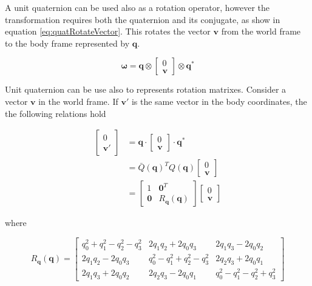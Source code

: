 \noindent A unit quaternion can be used also as a rotation operator, however the transformation requires both the quaternion and its conjugate, as show in equation \eqref{eq:quatRotateVector}. This rotates the vector $\mathbf{v}$ from the world frame to the body frame represented by $\mathbf{q}$.

\begin{equation}
	\boldsymbol{\omega} = \mathbf{q} \otimes 
	\begin{bmatrix}
		0 \\
		\mathbf{v}
	\end{bmatrix}
	\otimes \mathbf{q}^*
	\label{eq:quatRotateVector}
\end{equation}

\noindent Unit quaternion can be use also to represents rotation matrixes. Consider a vector $\mathbf{v}$ in the world frame. If $\mathbf{v}'$ is the same vector in the body coordinates, the the following relations hold

\begin{align}
	\begin{bmatrix}
		0 \\
		\mathbf{v}'
	\end{bmatrix}
	&= \mathbf{q} \cdot
	\begin{bmatrix}
		0 \\
		\mathbf{v}
	\end{bmatrix}
	\cdot \mathbf{q}^* \\
	&= \bar{Q}(\mathbf{q})^T Q(\mathbf{q})
	\begin{bmatrix}
		0 \\
		\mathbf{v}
	\end{bmatrix} \\
	&=
	\begin{bmatrix}
		1          & \mathbf{0}^T \\
		\mathbf{0} & R_{\mathbf{q}}(\mathbf{q})
	\end{bmatrix}
	\begin{bmatrix}
		0 \\
		\mathbf{v}
	\end{bmatrix}
	\label{eq:quatRotationMatrix1}
\end{align}

\noindent where

\begin{equation}
	R_{\mathbf{q}}(\mathbf{q}) =
	\begin{bmatrix}
		q_0^2+q_1^2-q_2^2-q_3^2 & 2q_1q_2+2q_0q_3         & 2q_1q_3-2q_0q_2 \\
		2q_1q_2-2q_0q_3         & q_0^2-q_1^2+q_2^2-q_3^2 & 2q_2q_3+2q_0q_1 \\
		2q_1q_3+2q_0q_2         & 2q_2q_3-2q_0q_1         & q_0^2-q_1^2-q_2^2+q_3^2
	\end{bmatrix}
	\label{eq:quatRotationMatrix2}
\end{equation}

